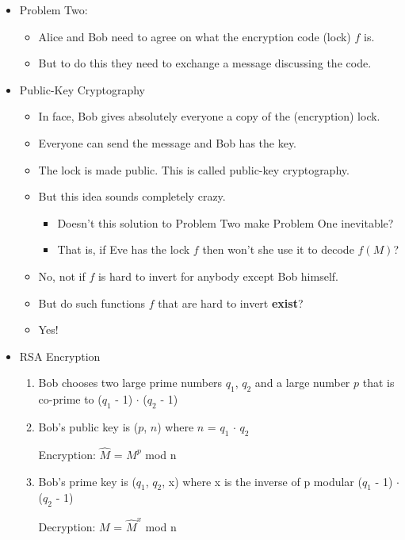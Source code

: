 \documentclass[12pt]{article}
\begin{document}
\begin{itemize}
\item Problem Two:
	\begin{itemize}
	\item Alice and Bob need to agree on what the encryption code (lock) $f$ is.
	\item But to do this they need to exchange a message discussing the code.
	\end{itemize}
\item Public-Key Cryptography
	\begin{itemize}
	\item In face, Bob gives absolutely everyone a copy of the (encryption) lock.
	\item Everyone can send the message and Bob has the key.
	\item The lock is made public. This is called public-key cryptography.
	\item But this idea sounds completely crazy.
		\begin{itemize}
		\item Doesn't this solution to Problem Two make Problem One inevitable?
		\item That is, if Eve has the lock $f$ then won't she use it to decode $f(M)$?
		\end{itemize}
	\item No, not if $f$ is hard to invert for anybody except Bob himself.
	\item But do such functions $f$ that are hard to invert \textbf{exist}?
	\item Yes!
	\end{itemize}
\item RSA Encryption
	\begin{enumerate}
	\item Bob chooses two large prime numbers $q_{1}$, $q_{2}$ and a large number $p$ that is co-prime to ($q_{1}$ - 1) $\cdot$ ($q_{2}$ - 1)
	\item Bob's public key is ($p$, $n$) where $n$ = $q_{1}$ $\cdot$ $q_{2}$ 
	
		\hspace*{\fill}Encryption: $\hat{M}$ = $M^p$ mod n\hspace*{\fill}
		
	\item Bob's prime key is ($q_1$, $q_2$, x) where x is the inverse of p modular ($q_{1}$ - 1) $\cdot$ ($q_{2}$ - 1)
	
		\hspace*{\fill}Decryption: $M$ = $\hat{M}^x$ mod n\hspace*{\fill}
		

\end{enumerate}
\end{itemize}
\end{document}
